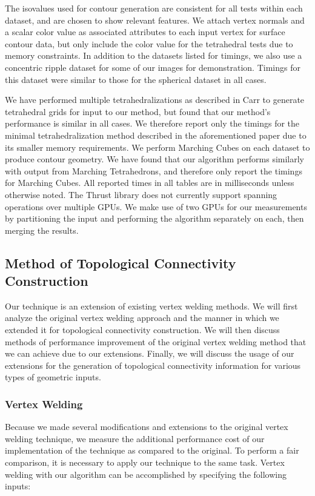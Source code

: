 \documentclass[review,journal]{vgtc}         %
\begin{document}
The isovalues used for contour generation are consistent for all tests within each dataset, and are chosen to show relevant features. We attach vertex normals and a scalar color value as associated attributes to each input vertex for surface contour data, but only include the color value for the tetrahedral tests due to memory constraints. In addition to the datasets listed for timings, we also use a concentric ripple dataset for some of our images for demonstration. Timings for this dataset were similar to those for the spherical dataset in all cases.

We have performed multiple tetrahedralizations as described in Carr \cite{Carr2006} to generate tetrahedral grids for input to our method, but found that our method's performance is similar in all cases. We therefore report only the timings for the minimal tetrahedralization method described in the aforementioned paper due to its smaller memory requirements. We perform Marching Cubes on each dataset to produce contour geometry. We have found that our algorithm performs similarly with output from Marching Tetrahedrons, and therefore only report the timings for Marching Cubes. All reported times in all tables are in milliseconds unless otherwise noted.  The Thrust library does not currently support spanning operations over multiple GPUs. We make use of two GPUs for our measurements by partitioning the input and performing the algorithm separately on each, then merging the results.


\subsection{Method of Topological Connectivity Construction}
Our technique is an extension of existing vertex welding methods. We will first analyze the original vertex welding approach and the manner in which we extended it for topological connectivity construction. We will then discuss methods of performance improvement of the original vertex welding method that we can achieve due to our extensions. Finally, we will discuss the usage of our extensions for the generation of topological connectivity information for various types of geometric inputs.

\subsubsection{Vertex Welding}

Because we made several modifications and extensions to the original vertex welding technique, we measure the additional performance
cost of our implementation of the technique as compared to the original. To perform a fair comparison, it is necessary to apply our technique to the same task. Vertex welding with
our  algorithm can be accomplished by specifying the following inputs:
\end{document}
